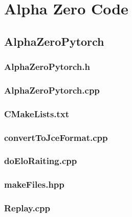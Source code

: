 \documentclass[12pt]{article}
\newcommand{\incFile}[2]{\label{code:#2}\newpage}
\begin{document}
\maketitle
\newpage
\tableofcontents
\newpage
\section{Alpha Zero Code}
\subsection{AlphaZeroPytorch}
\subsubsection{AlphaZeroPytorch.h}							\incFile{C++}{AlphaZeroPytorch/AlphaZeroPytorch.h}
\subsubsection{AlphaZeroPytorch.cpp}						\incFile{C++}{AlphaZeroPytorch/AlphaZeroPytorch.cpp}
\subsubsection{CMakeLists.txt}										\incFile{python}{AlphaZeroPytorch/CMakeLists.txt}
\subsubsection{convertToJceFormat.cpp}					\incFile{C++}{AlphaZeroPytorch/convertToJceFormat.cpp}
\subsubsection{doEloRaiting.cpp}									\incFile{C++}{AlphaZeroPytorch/doEloRaiting.cpp}
\subsubsection{makeFiles.hpp}										\incFile{C++}{AlphaZeroPytorch/makeFiles.hpp}
\subsubsection{Replay.cpp}											\incFile{C++}{AlphaZeroPytorch/Replay.cpp}
\end{document}

